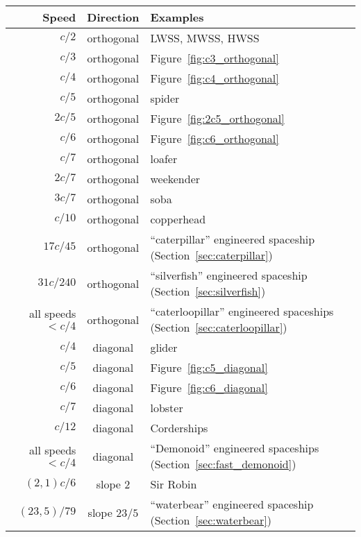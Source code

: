 \begin{table}[!htb]
	\begin{center}		
		\begin{tabular}{r c l}
			\toprule
			Speed & Direction & Examples \\ \midrule
			$c/2$ & orthogonal & LWSS, MWSS, HWSS \\
			\rowcolor{gray!20} $c/3$ & orthogonal & Figure~\ref{fig:c3_orthogonal} \\
			$c/4$ & orthogonal & Figure~\ref{fig:c4_orthogonal} \\
			\rowcolor{gray!20} $c/5$ & orthogonal & spider \\
			$2c/5$ & orthogonal & Figure~\ref{fig:2c5_orthogonal} \\
			\rowcolor{gray!20}$c/6$ & orthogonal & Figure~\ref{fig:c6_orthogonal} \\
			$c/7$ & orthogonal & loafer \\
			\rowcolor{gray!20} $2c/7$ & orthogonal & weekender \\
			$3c/7$ & orthogonal & soba\index{soba} \\
			\rowcolor{gray!20} $c/10$ & orthogonal & copperhead \\
			$17c/45$ & orthogonal & ``caterpillar''\index{caterpillar} engineered spaceship (Section~\ref{sec:caterpillar}) \\
			\rowcolor{gray!20} $31c/240$ & orthogonal & ``silverfish''\index{silverfish} engineered spaceship (Section~\ref{sec:silverfish}) \\
			all speeds $< c/4$ & orthogonal & ``caterloopillar''\index{caterloopillar} engineered spaceships (Section~\ref{sec:caterloopillar}) \\
			\rowcolor{gray!20} $c/4$ & diagonal & glider \\
			$c/5$ & diagonal & Figure~\ref{fig:c5_diagonal} \\
			\rowcolor{gray!20} $c/6$ & diagonal & Figure~\ref{fig:c6_diagonal} \\
			$c/7$ & diagonal & lobster \\
			\rowcolor{gray!20} $c/12$ & diagonal & Corderships\index{Cordership} \\
			all speeds $< c/4$ & diagonal & ``Demonoid'' engineered spaceships\index{Demonoid} (Section~\ref{sec:fast_demonoid}) \\
			\rowcolor{gray!20} $(2,1)c/6$ & slope $2$ & Sir Robin \\
			$(23,5)/79$ & slope $23/5$ & ``waterbear''\index{waterbear} engineered spaceship (Section~\ref{sec:waterbear}) \\

\end{tabular}
\end{center}
\end{table}
